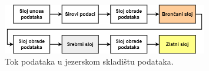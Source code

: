 \begin{figure}
    \centering
    \includegraphics[width=0.8\textwidth]{images/tok_podataka.drawio.png}
    \caption{Tok podataka u jezerskom skladištu podataka.}
    \label{figure:datalakehouse_data_flow}
\end{figure}
